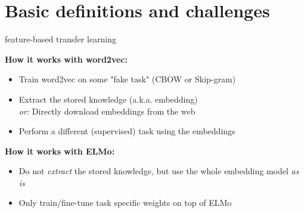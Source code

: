 

\section{Basic definitions and challenges}

\begin{frame}{feature-based transfer learning}

\vfill

	\textbf{How it works with word2vec:}
	
	\begin{itemize}
		\item Train word2vec on some "fake task" (CBOW or Skip-gram)
		\item Extract the stored knowledge (a.k.a. embedding)\\
					\textit{or:} Directly download embeddings from the web 
		\item Perform a different (supervised) task using the embeddings
	\end{itemize}
	
	\vspace{.3cm}
	
	\textbf{How it works with ELMo:}
	
	\begin{itemize}
		\item Do not \textit{extract} the stored knowledge, but use the whole embedding model \textit{as is}
		\item Only train/fine-tune task specific weights on top of ELMo
	\end{itemize}
	
\vfill

\end{frame}


